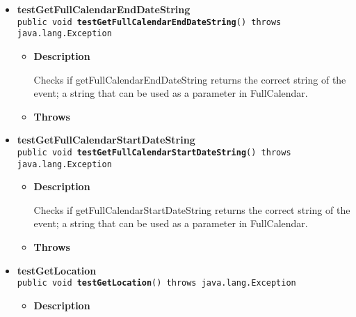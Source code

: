 \documentclass[11pt,a4paper]{report}
\begin{document}
{{{\begin{itemize}
{\begin{itemize}
{Checks if getEnd returns the correct date.
}
\item{{\bf  Throws}
}%
\end{itemize}
}%
\item{ 
\hypertarget{is.mpg.ruglan.test.CalEventTest.testGetFullCalendarEndDateString()}{{\bf  testGetFullCalendarEndDateString}\\}
\texttt{public void\ {\bf  testGetFullCalendarEndDateString}() throws java.lang.Exception
\label{is.mpg.ruglan.test.CalEventTest.testGetFullCalendarEndDateString()}}%
\begin{itemize}
\item{
{\bf  Description}

Checks if getFullCalendarEndDateString returns the correct string of the event; a string that can be used as a parameter in FullCalendar.
}
\item{{\bf  Throws}
}%
\end{itemize}
}%
\item{ 
\hypertarget{is.mpg.ruglan.test.CalEventTest.testGetFullCalendarStartDateString()}{{\bf  testGetFullCalendarStartDateString}\\}
\texttt{public void\ {\bf  testGetFullCalendarStartDateString}() throws java.lang.Exception
\label{is.mpg.ruglan.test.CalEventTest.testGetFullCalendarStartDateString()}}%
\begin{itemize}
\item{
{\bf  Description}

Checks if getFullCalendarStartDateString returns the correct string of the event; a string that can be used as a parameter in FullCalendar.
}
\item{{\bf  Throws}
}%
\end{itemize}
}%
\item{ 
\hypertarget{is.mpg.ruglan.test.CalEventTest.testGetLocation()}{{\bf  testGetLocation}\\}
\texttt{public void\ {\bf  testGetLocation}() throws java.lang.Exception
\label{is.mpg.ruglan.test.CalEventTest.testGetLocation()}}%
\begin{itemize}
\item{
{\bf  Description}

}
\end{itemize}}
\end{itemize}}}}
\end{document}
